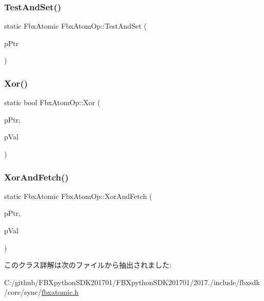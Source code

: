 \mbox{\label{class_fbx_atom_op_af84c36d501a05600e44f4ef6a3477d2a}} 
\subsubsection{\texorpdfstring{Test\+And\+Set()}{TestAndSet()}}
{\footnotesize\ttfamily static Fbx\+Atomic Fbx\+Atom\+Op\+::\+Test\+And\+Set (\begin{DoxyParamCaption}\item[{volatile Fbx\+Atomic $\ast$}]{p\+Ptr }\end{DoxyParamCaption})\hspace{0.3cm}{\ttfamily [static]}}

\mbox{\label{class_fbx_atom_op_a30a91a335e4ccf4b40a4681697ea2478}} 
\subsubsection{\texorpdfstring{Xor()}{Xor()}}
{\footnotesize\ttfamily static bool Fbx\+Atom\+Op\+::\+Xor (\begin{DoxyParamCaption}\item[{volatile Fbx\+Atomic $\ast$}]{p\+Ptr,  }\item[{Fbx\+Atomic}]{p\+Val }\end{DoxyParamCaption})\hspace{0.3cm}{\ttfamily [static]}}

\mbox{\label{class_fbx_atom_op_a25b6645fecbc0bb11c46bb19afeb262a}} 
\subsubsection{\texorpdfstring{Xor\+And\+Fetch()}{XorAndFetch()}}
{\footnotesize\ttfamily static Fbx\+Atomic Fbx\+Atom\+Op\+::\+Xor\+And\+Fetch (\begin{DoxyParamCaption}\item[{volatile Fbx\+Atomic $\ast$}]{p\+Ptr,  }\item[{Fbx\+Atomic}]{p\+Val }\end{DoxyParamCaption})\hspace{0.3cm}{\ttfamily [static]}}



このクラス詳解は次のファイルから抽出されました\+:\begin{DoxyCompactItemize}
\item 
C\+:/github/\+F\+B\+Xpython\+S\+D\+K201701/\+F\+B\+Xpython\+S\+D\+K201701/2017./include/fbxsdk/core/sync/\hyperlink{fbxatomic_8h}{fbxatomic.\+h}\end{DoxyCompactItemize}
